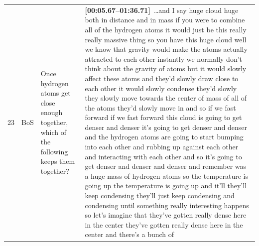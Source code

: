 \documentclass[10pt]{article}
\begin{document}
\begin{tiny}
\begin{longtable}{r p{0.3in} p{1.212in} p{3.8in}}
    23 &          BoS &                                                                                                                                                                                       Once hydrogen atoms get close enough together, which of the following keeps them together? &                                                                                                                                                                                                                                                                                                                                                                                                                                                                                                                                                                                                                                                                                                                                                                                                                                                                                                                                                                                                                                                                                                                                                                                                                                                                                                                                                                                                                                                                                                                                                                                                                                                                                                                                                                                                \textbf{[00:05.67--01:36.71]}~\ldots and I say huge cloud huge both in distance and in mass if you were to combine all of the hydrogen atoms it would just be this really really massive thing so you have this huge cloud well we know that gravity would make the atoms actually attracted to each other instantly we normally don't think about the gravity of atoms but it would slowly affect these atoms and they'd slowly draw close to each other it would slowly condense they'd slowly they slowly move towards the center of mass of all of the atoms they'd slowly move in and so if we fast forward if we fast forward this cloud is going to get denser and denser it's going to get denser and denser and the hydrogen atoms are going to start bumping into each other and rubbing up against each other and interacting with each other and so it's going to get denser and denser and denser and remember was a huge mass of hydrogen atoms so the temperature is going up the temperature is going up and it'll they'll keep condensing they'll just keep condensing and condensing until something really interesting happens so let's imagine that they've gotten really dense here in the center they've gotten really dense here in the center and there's a bunch of 
\end{longtable}
\end{tiny}
\end{document}
